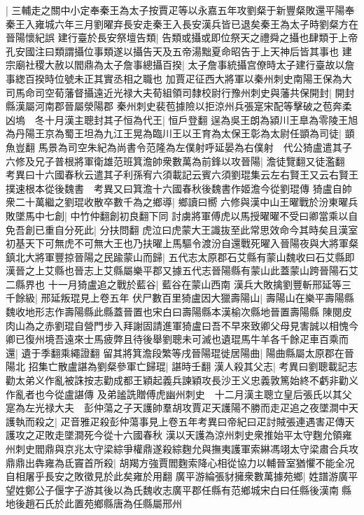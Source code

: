 |{
	三輔走之關中小定奉秦王為太子按賈疋等以永嘉五年攻劉粲于新豐粲敗還平陽奉秦王入雍城六年三月劉曜弃長安走秦王入長安漢兵皆已退矣秦王為太子時劉粲方在晉陽懷紀誤}
建行臺於長安祭壇告類|{
	告類或攝或即位祭天之禮舜之攝也肆類于上帝孔安國注曰類謂攝位事類遂以攝告天及五帝湯黜夏命昭告于上天神后皆其事也}
建宗廟社稷大赦以閻鼎為太子詹事總攝百揆|{
	太子詹事統攝宫僚時太子建行臺故以詹事緫百揆時位號未正其實丞相之職也}
加賈疋征西大將軍以秦州刺史南陽王保為大司馬命司空荀藩督攝遠近光禄大夫荀組領司隸校尉行豫州刺史與藩共保開封|{
	開封縣漢屬河南郡晉屬滎陽郡}
秦州刺史裴苞據險以拒涼州兵張寔宋配等擊破之苞奔柔凶塢　冬十月漢主聰封其子恒為代王|{
	恒戶登翻}
逞為吳王朗為潁川王臯為零陵王旭為丹陽王京為蜀王坦為九江王晃為臨川王以王育為太保王彰為太尉任顗為司徒|{
	顗魚豈翻}
馬景為司空朱紀為尚書令范隆為左僕射呼延晏為右僕射　代公猗盧遣其子六修及兄子普根將軍衛雄范班箕澹帥衆數萬為前鋒以攻晉陽|{
	澹徒覽翻又徒濫翻　考異曰十六國春秋云遣其子利孫宥六須載記云賓六須劉琨集云左右賢王又云右賢王撲速根本從後魏書　考異又曰箕澹十六國春秋後魏書作姬澹今從劉琨傳}
猗盧自帥衆二十萬繼之劉琨收散卒數千為之鄉導|{
	鄉讀曰嚮}
六修與漢中山王曜戰於汾東曜兵敗墜馬中七創|{
	中竹仲翻創初良翻下同}
討虜將軍傅虎以馬授曜曜不受曰卿當乘以自免吾創已重自分死此|{
	分扶問翻}
虎泣曰虎蒙大王識抜至此常思效命今其時矣且漢室初基天下可無虎不可無大王也乃扶曜上馬驅令渡汾自還戰死曜入晉陽夜與大將軍粲鎮北大將軍豐掠晉陽之民踰蒙山而歸|{
	五代志太原郡石艾縣有蒙山魏收曰石艾縣即漢晉之上艾縣也晉志上艾縣屬樂平郡又據五代志晉陽縣有蒙山此蓋蒙山跨晉陽石艾二縣界也}
十一月猗盧追之戰於藍谷|{
	藍谷在蒙山西南}
漢兵大敗擒劉豐斬邢延等三千餘級|{
	邢延叛琨見上卷五年}
伏尸數百里猗盧因大獵壽陽山|{
	壽陽山在樂平壽陽縣魏收地形志作壽陽縣此縣蓋晉置也宋白曰壽陽縣本漢榆次縣地晉置壽陽縣}
陳閱皮肉山為之赤劉琨自營門步入拜謝固請進軍猗盧曰吾不早來致卿父母見害誠以相愧今卿已復州境吾遠來士馬疲弊且待後舉劉聰未可滅也遺琨馬牛羊各千餘疋車百乘而還|{
	遺于季翻乘繩證翻}
留其將箕澹段繁等戌晉陽琨徙居陽曲|{
	陽曲縣屬太原郡在晉陽北}
招集亡散盧諶為劉粲參軍亡歸琨|{
	諶時壬翻}
漢人殺其父志|{
	考異曰劉聰載記志勸太弟义作亂被誅按志勸成都王穎起義兵諫穎攻長沙王义忠義敦篤始終不虧非勸义作亂者也今從盧諶傳}
及弟謐詵贈傅虎幽州刺史　十二月漢主聰立皇后張氏以其父寔為左光禄大夫　彭仲蕩之子天護帥羣胡攻賈疋天護陽不勝而走疋追之夜墜澗中天護執而殺之|{
	疋音雅疋殺彭仲蕩事見上卷五年考異曰帝紀曰疋討賊張連遇害疋傳天護攻之疋敗走墜澗死今從十六國春秋}
漢以天護為涼州刺史衆推始平太守麴允領雍州刺史閻鼎與京兆太守梁綜爭權鼎遂殺綜麴允與撫夷護軍索綝馮翊太守梁肅合兵攻鼎鼎出犇雍為氐竇首所殺|{
	胡羯方強賈閻麴索降心相從協力以輔晉室猶懼不能全况自相屠乎長安之敗徵見於此矣雍於用翻}
廣平游綸張豺擁衆數萬據苑鄉|{
	姓譜游廣平望姓鄭公子偃字子游其後以為氏魏收志廣平郡任縣有范鄉城宋白曰任縣後漢南縣地後趙石氏於此置苑鄉縣唐為任縣屬邢州}
